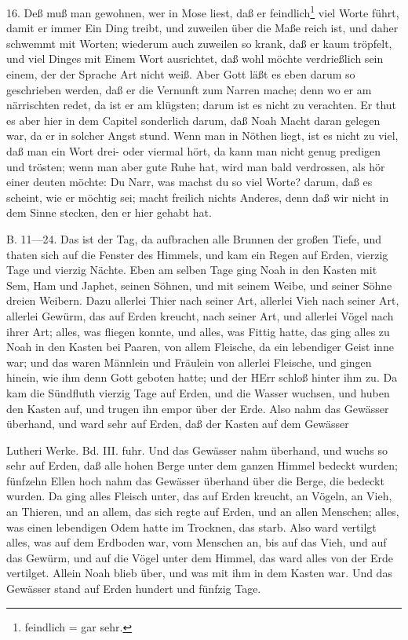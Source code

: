 16. Deß muß man gewohnen, wer in Mose liest, daß er feindlich\footnote{feindlich = gar sehr.} viel Worte führt, damit er immer Ein Ding treibt, und zuweilen über die Maße reich ist, und daher schwemmt mit Worten; wiederum auch zuweilen so krank, daß er kaum tröpfelt, und viel Dinges mit Einem Wort ausrichtet, daß wohl möchte verdrießlich sein einem, der der Sprache Art nicht weiß. Aber Gott läßt es eben darum so geschrieben werden, daß er die Vernunft zum Narren mache; denn wo er am närrischten redet, da ist er am klügsten; darum ist es nicht zu verachten. Er thut es aber hier in dem Capitel sonderlich darum, daß Noah Macht daran gelegen war, da er in solcher Angst stund. Wenn man in Nöthen liegt, ist es nicht zu viel, daß man ein Wort drei- oder viermal hört, da kann man nicht genug predigen und trösten; wenn man aber gute Ruhe hat, wird man bald verdrossen, als hör einer deuten möchte: Du Narr, was machst du so viel Worte? darum, daß es scheint, wie er möchtig sei; macht freilich nichts Anderes, denn daß wir nicht in dem Sinne stecken, den er hier gehabt hat.

B. 11—24. Das ist der Tag, da aufbrachen alle Brunnen der großen Tiefe, und thaten sich auf die Fenster des Himmels, und kam ein Regen auf Erden, vierzig Tage und vierzig Nächte. Eben am selben Tage ging Noah in den Kasten mit Sem, Ham und Japhet, seinen Söhnen, und mit seinem Weibe, und seiner Söhne dreien Weibern. Dazu allerlei Thier nach seiner Art, allerlei Vieh nach seiner Art, allerlei Gewürm, das auf Erden kreucht, nach seiner Art, und allerlei Vögel nach ihrer Art; alles, was fliegen konnte, und alles, was Fittig hatte, das ging alles zu Noah in den Kasten bei Paaren, von allem Fleische, da ein lebendiger Geist inne war; und das waren Männlein und Fräulein von allerlei Fleische, und gingen hinein, wie ihm denn Gott geboten hatte; und der HErr schloß hinter ihm zu. Da kam die Sündfluth vierzig Tage auf Erden, und die Wasser wuchsen, und huben den Kasten auf, und trugen ihn empor über der Erde. Also nahm das Gewässer überhand, und ward sehr auf Erden, daß der Kasten auf dem Gewässer

Lutheri Werke. Bd. III.
fuhr. Und das Gewässer nahm überhand, und wuchs so sehr auf Erden, daß alle hohen Berge unter dem ganzen Himmel bedeckt wurden; fünfzehn Ellen hoch nahm das Gewässer überhand über die Berge, die bedeckt wurden. Da ging alles Fleisch unter, das auf Erden kreucht, an Vögeln, an Vieh, an Thieren, und an allem, das sich regte auf Erden, und an allen Menschen; alles, was einen lebendigen Odem hatte im Trocknen, das starb. Also ward vertilgt alles, was auf dem Erdboden war, vom Menschen an, bis auf das Vieh, und auf das Gewürm, und auf die Vögel unter dem Himmel, das ward alles von der Erde vertilget. Allein Noah blieb über, und was mit ihm in dem Kasten war. Und das Gewässer stand auf Erden hundert und fünfzig Tage.

